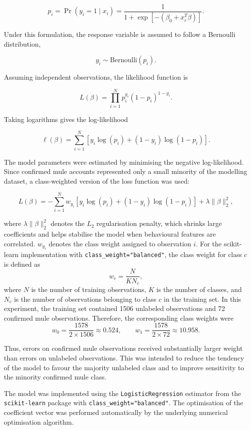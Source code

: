 \[
p_i
=
\Pr(y_i=1 \mid x_i)
=
\frac{1}
{1+\exp\left[-(\beta_0+x_i^{T}\beta)\right]}.
\]

Under this formulation, the response variable is assumed to follow a Bernoulli
distribution,

\[
y_i \sim \mathrm{Bernoulli}(p_i).
\]

Assuming independent observations, the likelihood function is

\[
L(\beta)
=
\prod_{i=1}^{N}
p_i^{y_i}
(1-p_i)^{1-y_i}.
\]

Taking logarithms gives the log-likelihood

\[
\ell(\beta)
=
\sum_{i=1}^{N}
\left[
y_i \log(p_i)
+
(1-y_i)\log(1-p_i)
\right].
\]

The model parameters were estimated by minimising the negative log-likelihood.
Since confirmed mule accounts represented only a small minority of the modelling
dataset, a class-weighted version of the loss function was used\citep{he2009learning}:

\[
L(\beta)
=
-\sum_{i=1}^{N}
w_{y_i}
\left[
y_i \log(p_i) + (1-y_i)\log(1-p_i)
\right]
+
\lambda \|\beta\|_2^2,
\]

where \(\lambda \|\beta\|_2^2\) denotes the \(L_2\) regularisation penalty, which shrinks large coefficients and helps stabilise the model when behavioural features are correlated.  \(w_{y_i}\) denotes the class weight assigned to observation \(i\).
For the scikit-learn implementation \cite{sklearn_logistic} with \texttt{class\_weight="balanced"}, the class weight for class \(c\) is defined as
\[
w_c = \frac{N}{K N_c} ,
\]
where \(N\) is the number of training observations, \(K\) is the number of classes, and \(N_c\) is the number of observations belonging to class \(c\) in the training set. In this experiment, the training set contained 1506 unlabeled observations and 72 confirmed mule observations. Therefore, the corresponding class weights were
\[
w_0 = \frac{1578}{2 \times 1506} \approx 0.524,
\qquad
w_1 = \frac{1578}{2 \times 72} \approx 10.958.
\]

Thus, errors on confirmed mule observations received substantially larger weight than errors on unlabeled observations. This was intended to reduce the tendency of the model to favour the majority unlabeled class and to improve sensitivity to the minority confirmed mule class.


The model was implemented using the \texttt{LogisticRegression} estimator from
the \texttt{scikit-learn} package with \texttt{class\_weight="balanced"}.
The optimisation of the coefficient vector was performed automatically by the
underlying numerical optimisation algorithm.
